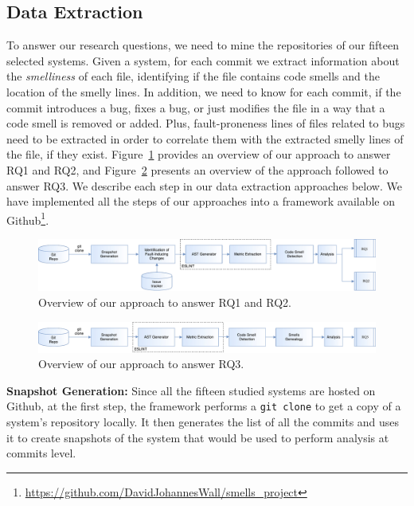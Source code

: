 \documentclass[smallcondensed]{svjour3}
\newcommand{\mytitle}[1]{\textbf{#1:}}
\begin{document}
\subsection{Data Extraction}\label{extraction}
To answer our research questions, we need to mine the repositories of our fifteen selected systems. {\color{blue} Given a system, for each commit we extract information about the \emph{smelliness} of each file, identifying if the file contains code smells and the location of the smelly lines}. In addition, we need to know for each commit, if the commit introduces a bug, fixes a bug, or just modifies the file in a way that a code smell is removed or added. {\color{blue}Plus, fault-proneness lines of files related to bugs need to be extracted in order to correlate them with the extracted smelly lines of the file, if they exist.} Figure~\ref{process} provides an overview of our approach to answer RQ1 and RQ2, and Figure~\ref{process3} presents an overview of the approach followed to answer RQ3. We describe each step in our data extraction approaches below. We have implemented all the steps of our approaches into a framework available on Github\footnote{\url{https://github.com/DavidJohannesWall/smells_project}}.

\begin{figure}[t]
\captionsetup{font=small}
\centering%
	\includegraphics[scale=0.4]{total.pdf}
	\caption{Overview of our approach to answer RQ1 and RQ2.}
\label{process}
\vspace{-15pt}
\end{figure}

\begin{figure}[th]
	\captionsetup{font=small}
	\centering%
	\includegraphics[scale=0.4]{total3.pdf}
	\caption{Overview of our approach to answer RQ3.}
	\label{process3}
	\vspace{-15pt}
\end{figure}

\mytitle{Snapshot Generation} Since all the fifteen studied systems are hosted on Github, at the first step, the framework performs a \texttt{git clone} to get a copy of a system's repository locally. It then generates the list of all the commits and uses it to create snapshots of the system that would be used to perform analysis at commits level.
\end{document}
